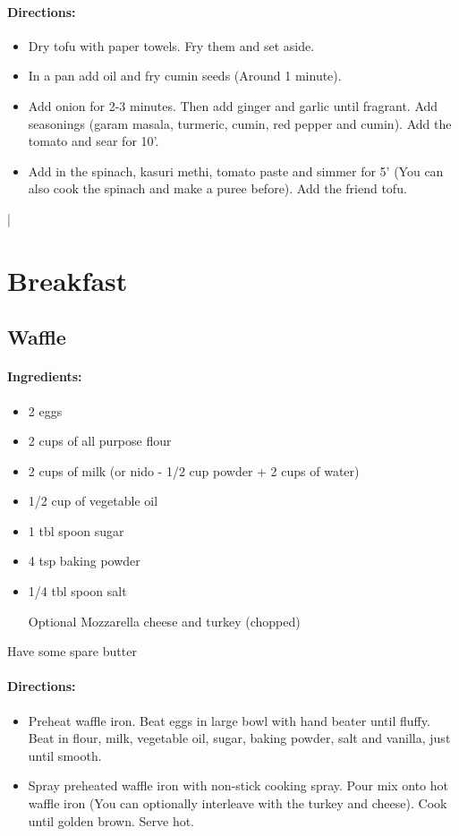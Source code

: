 \documentclass{article}
\begin{document}
\paragraph{Directions:}
\begin{itemize}
\item Dry tofu with paper towels. Fry them and set aside.
\item In a pan add oil and fry cumin seeds (Around 1 minute). \item Add onion for 2-3 minutes. Then add ginger and garlic until fragrant. Add seasonings (garam masala, turmeric, cumin, red pepper and cumin). Add the tomato and sear for 10'.

\item Add in the spinach, kasuri methi, tomato paste and simmer for 5' (You can also cook the spinach and make a puree before). Add the friend tofu. 
\end{itemize}|

\section{Breakfast}

\subsection{Waffle}

\paragraph{Ingredients:}

\begin{itemize}
	\item 2 eggs
	\item 2 cups of all purpose flour
	\item 2 cups of milk (or nido - 1/2 cup powder + 2 cups of water)
	\item 1/2 cup of vegetable oil
	\item 1 tbl spoon sugar
	\item 4 tsp baking powder
	\item 1/4 tbl spoon salt
	\item [Optional] Mozzarella cheese and turkey (chopped)
\end{itemize}

Have some spare butter

\paragraph{Directions:}
\begin{itemize}
	\item Preheat waffle iron. Beat eggs in large bowl with hand beater until fluffy. Beat in flour, milk, vegetable oil, sugar, baking powder, salt and vanilla, just until smooth.
	\item Spray preheated waffle iron with non-stick cooking spray. Pour mix onto hot waffle iron (You can optionally interleave with the turkey and cheese). Cook until golden brown. Serve hot.
\end{itemize}
\end{document}

